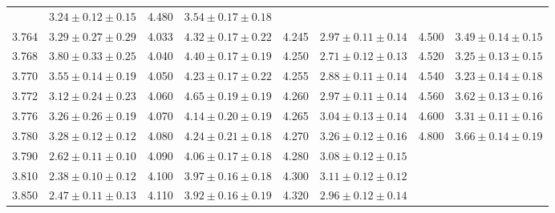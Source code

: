 \begin{table}[htbp]
\begin{center}
\begin{tabular}{cccccccc}
& $3.24\pm0.12\pm0.15$ &4.480& $3.54\pm0.17\pm0.18$ \\
3.764& $3.29\pm0.27\pm0.29$ &4.033& $4.32\pm0.17\pm0.22$ &4.245
& $2.97\pm0.11\pm0.14$ &4.500& $3.49\pm0.14\pm0.15$ \\
3.768& $3.80\pm0.33\pm0.25$ &4.040& $4.40\pm0.17\pm0.19$ &4.250
& $2.71\pm0.12\pm0.13$ &4.520& $3.25\pm0.13\pm0.15$ \\
3.770& $3.55\pm0.14\pm0.19$ &4.050& $4.23\pm0.17\pm0.22$ &4.255
& $2.88\pm0.11\pm0.14$ &4.540& $3.23\pm0.14\pm0.18$ \\
3.772& $3.12\pm0.24\pm0.23$ &4.060& $4.65\pm0.19\pm0.19$ &4.260
& $2.97\pm0.11\pm0.14$ &4.560& $3.62\pm0.13\pm0.16$ \\
3.776& $3.26\pm0.26\pm0.19$ &4.070& $4.14\pm0.20\pm0.19$ &4.265
& $3.04\pm0.13\pm0.14$ &4.600& $3.31\pm0.11\pm0.16$ \\
3.780& $3.28\pm0.12\pm0.12$ &4.080& $4.24\pm0.21\pm0.18$ &4.270
& $3.26\pm0.12\pm0.16$ &4.800& $3.66\pm0.14\pm0.19$ \\
3.790& $2.62\pm0.11\pm0.10$ &4.090& $4.06\pm0.17\pm0.18$ &4.280
& $3.08\pm0.12\pm0.15$ &     &                      \\
3.810& $2.38\pm0.10\pm0.12$ &4.100& $3.97\pm0.16\pm0.18$ &4.300
& $3.11\pm0.12\pm0.12$ &     &                      \\
3.850& $2.47\pm0.11\pm0.13$ &4.110& $3.92\pm0.16\pm0.19$ &4.320
& $2.96\pm0.12\pm0.14$ &     &                      \\
\end{tabular}
\label{tab:rvalue}
\end{center}
\end{table}



